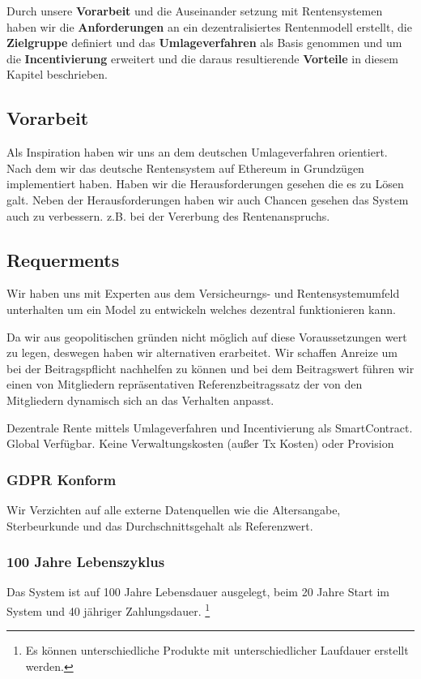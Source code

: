 Durch unsere \textbf{Vorarbeit} und die Auseinander setzung mit Rentensystemen haben wir die \textbf{Anforderungen} an ein dezentralisiertes Rentenmodell erstellt, die  \textbf{Zielgruppe} definiert und das \textbf{Umlageverfahren} als Basis genommen und um die \textbf{Incentivierung} erweitert und die daraus resultierende \textbf{Vorteile} in diesem Kapitel beschrieben.

\subsection{Vorarbeit}

Als Inspiration haben wir uns an dem deutschen Umlageverfahren orientiert. Nach dem wir das deutsche Rentensystem auf Ethereum in Grundzügen implementiert haben. Haben wir die Herausforderungen gesehen die es zu Lösen galt.
Neben der Herausforderungen haben wir auch Chancen gesehen das System auch zu verbessern. z.B. bei der Vererbung des Rentenanspruchs.


\subsection{Requerments}

Wir haben uns mit Experten aus dem Versicheurngs- und Rentensystemumfeld unterhalten um ein Model zu entwickeln welches dezentral funktionieren kann.

Da wir aus geopolitischen gründen nicht möglich auf diese Voraussetzungen wert zu legen, deswegen haben wir alternativen erarbeitet.
Wir schaffen Anreize um bei der Beitragspflicht nachhelfen zu können und bei dem Beitragswert führen wir einen von Mitgliedern repräsentativen Referenzbeitragssatz der von den Mitgliedern dynamisch sich an das Verhalten anpasst.

Dezentrale Rente mittels Umlageverfahren und Incentivierung als SmartContract.
Global Verfügbar. Keine Verwaltungskosten (außer Tx Kosten) oder Provision


\subsubsection*{GDPR Konform}
Wir Verzichten auf alle externe Datenquellen wie die Altersangabe, Sterbeurkunde
 und das Durchschnittsgehalt als Referenzwert.

\subsubsection*{100 Jahre Lebenszyklus}
Das System ist auf 100 Jahre Lebensdauer ausgelegt, beim 20 Jahre Start im System und 40 jähriger Zahlungsdauer. \footnote{ Es können unterschiedliche Produkte mit unterschiedlicher Laufdauer erstellt werden.}

